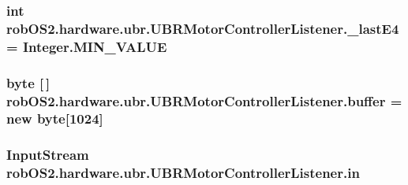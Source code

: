 \label{classrob_o_s2_1_1hardware_1_1ubr_1_1_u_b_r_motor_controller_listener_a38bbf41336b0f9f020418e435a2afd44}
\hypertarget{classrob_o_s2_1_1hardware_1_1ubr_1_1_u_b_r_motor_controller_listener_a3650f51a7354bef1f04b3117b6ff1281}{
\subsubsection[{\_\-lastE4}]{\setlength{\rightskip}{0pt plus 5cm}int {\bf robOS2.hardware.ubr.UBRMotorControllerListener.\_\-lastE4} = Integer.MIN\_\-VALUE}}
\label{classrob_o_s2_1_1hardware_1_1ubr_1_1_u_b_r_motor_controller_listener_a3650f51a7354bef1f04b3117b6ff1281}
\hypertarget{classrob_o_s2_1_1hardware_1_1ubr_1_1_u_b_r_motor_controller_listener_a75999c94910236d2248d6be6e82c7546}{
\subsubsection[{buffer}]{\setlength{\rightskip}{0pt plus 5cm}byte \mbox{[}$\,$\mbox{]} {\bf robOS2.hardware.ubr.UBRMotorControllerListener.buffer} = new byte\mbox{[}1024\mbox{]}}}
\label{classrob_o_s2_1_1hardware_1_1ubr_1_1_u_b_r_motor_controller_listener_a75999c94910236d2248d6be6e82c7546}
\hypertarget{classrob_o_s2_1_1hardware_1_1ubr_1_1_u_b_r_motor_controller_listener_a45a48cca4f8ba67eb9566eea4aa8db70}{
\subsubsection[{in}]{\setlength{\rightskip}{0pt plus 5cm}InputStream {\bf robOS2.hardware.ubr.UBRMotorControllerListener.in}}}
